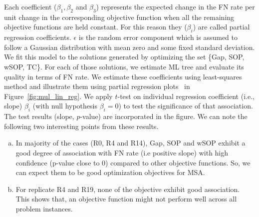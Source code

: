 Each coefficient ($\beta_1, \beta_2$ and $\beta_3$) represents the expected change in the FN rate per unit change in the corresponding objective function when all the remaining objective functions are held constant. For this reason they ($\beta_i$) are called partial regression coefficients. $\epsilon$ is the random error component which is assumed to follow a Gaussian distribution with mean zero and some fixed standard deviation. We fit this model to the solutions generated by optimizing the set \{Gap, SOP, wSOP, TC\}. For each of those solutions, we estimate ML tree and evaluate its quality in terms of FN rate.  We estimate these coefficients using least-squares method and illustrate them using partial regression plots~\citep{montgomery2012introduction} in Figure~\ref{fig:mul_lin_reg}. We apply $t$-test on individual regression coefficient (i.e., slope) $\beta_i$ (with null hypothesis $\beta_i=0$) to test the significance of that association. The test results (slope, $p$-value) are incorporated in the figure. We can note the following two interesting points from these results.
\begin{enumerate}[(a)]
	\item In majority of the cases (R0, R4 and R14), Gap, SOP and wSOP exhibit a good degree of association with FN rate (i.e positive slope) with high confidence (p-value close to 0) compared to other objective functions. So, we can expect them to be good optimization objectives for MSA.
	\item For replicate R4 and R19, none of the objective exhibit good association. This shows that, an objective function might not perform well across all problem instances. 
\end{enumerate}

